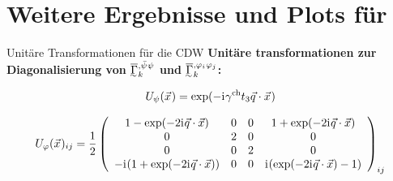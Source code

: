 \section{Weitere Ergebnisse und Plots für  }

\begin{frame}{Unitäre Transformationen für die CDW}
\label{cdwU}
\textbf{Unitäre transformationen zur Diagonalisierung von $\FSvertexArg{\FSeaaEoMI}{\MFpsib, \MFpsi}$ und $\FSvertexArg{\FSeaaEoMI}{\MFphi_i, \MFphi_j}$:}

\begin{align*}
U_\psi(\vec{x}\mskip1.0mu)= \exp(- \mathrm{i}\mkern1mu \gamma^{\mathrm{ch}} t_3 \vec{q}\cdot\vec{x}\mskip1.0mu)
\end{align*}

\begin{align*}
U_\varphi(\vec{x}\mskip1.0mu)_{ij}=\frac{1}{2}\left(
\begin{array}{cccc}
	1 - \exp(-2\mathrm{i}\mkern1mu \vec q \cdot \vec x)& 0& 0& 1+\exp(-2\mathrm{i}\mkern1mu \vec q \cdot \vec x)\\
	0 & 2& 0&0\\
	0 & 0& 2&0\\
	-\mathrm{i}\mkern1mu(1+\exp(-2\mathrm{i}\mkern1mu \vec q \cdot \vec x)) & 0& 0& \mathrm{i}\mkern1mu(\exp(-2\mathrm{i}\mkern1mu \vec q \cdot \vec x)-1)\\
\end{array}
\right)_{ij}
\end{align*}
\end{frame}

